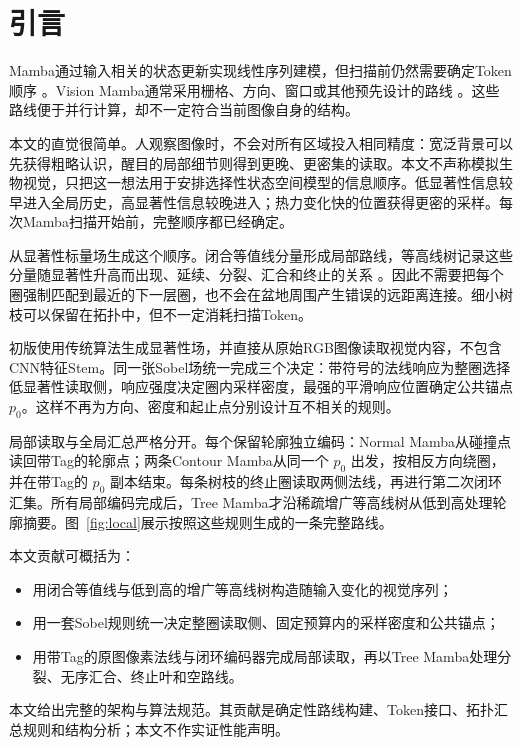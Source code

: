 \section{引言}

Mamba通过输入相关的状态更新实现线性序列建模，但扫描前仍然需要确定Token顺序 \cite{gu2023mamba}。Vision Mamba通常采用栅格、方向、窗口或其他预先设计的路线 \cite{zhu2024vim,liu2024vmamba,yang2024plainmamba,huang2024localmamba}。这些路线便于并行计算，却不一定符合当前图像自身的结构。

本文的直觉很简单。人观察图像时，不会对所有区域投入相同精度：宽泛背景可以先获得粗略认识，醒目的局部细节则得到更晚、更密集的读取。本文不声称模拟生物视觉，只把这一想法用于安排选择性状态空间模型的信息顺序。低显著性信息较早进入全局历史，高显著性信息较晚进入；热力变化快的位置获得更密的采样。每次Mamba扫描开始前，完整顺序都已经确定。

\method{}从显著性标量场生成这个顺序。闭合等值线分量形成局部路线，等高线树记录这些分量随显著性升高而出现、延续、分裂、汇合和终止的关系 \cite{carr2003contourtrees}。因此不需要把每个圈强制匹配到最近的下一层圈，也不会在盆地周围产生错误的远距离连接。细小树枝可以保留在拓扑中，但不一定消耗扫描Token。

初版使用传统算法生成显著性场，并直接从原始RGB图像读取视觉内容，不包含CNN特征Stem。同一张Sobel场统一完成三个决定：带符号的法线响应为整圈选择低显著性读取侧，响应强度决定圈内采样密度，最强的平滑响应位置确定公共锚点 $p_0$。这样不再为方向、密度和起止点分别设计互不相关的规则。

局部读取与全局汇总严格分开。每个保留轮廓独立编码：Normal Mamba从碰撞点读回带Tag的轮廓点；两条Contour Mamba从同一个 $p_0$ 出发，按相反方向绕圈，并在带Tag的 $p_0$ 副本结束。每条树枝的终止圈读取两侧法线，再进行第二次闭环汇集。所有局部编码完成后，Tree Mamba才沿稀疏增广等高线树从低到高处理轮廓摘要。图~\ref{fig:local}展示按照这些规则生成的一条完整路线。

本文贡献可概括为：
\begin{itemize}
    \item 用闭合等值线与低到高的增广等高线树构造随输入变化的视觉序列；
    \item 用一套Sobel规则统一决定整圈读取侧、固定预算内的采样密度和公共锚点；
    \item 用带Tag的原图像素法线与闭环编码器完成局部读取，再以Tree Mamba处理分裂、无序汇合、终止叶和空路线。
\end{itemize}

本文给出完整的架构与算法规范。其贡献是确定性路线构建、Token接口、拓扑汇总规则和结构分析；本文不作实证性能声明。
